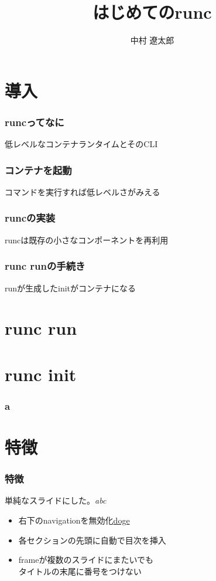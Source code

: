 \documentclass[unicode, 14pt]{beamer}
\title{はじめてのrunc}
\author{中村 遼太郎}
\begin{document}
\begin{frame}
\titlepage
\end{frame}
\section{導入}
\begin{frame}[t]
  \frametitle{runcってなに}
  低レベルなコンテナランタイムとそのCLI
\end{frame}
\begin{frame}[t]
  \frametitle{コンテナを起動}
  コマンドを実行すれば低レベルさがみえる
\end{frame}
\begin{frame}[t]
  \frametitle{runcの実装}
  runcは既存の小さなコンポーネントを再利用
\end{frame}
\begin{frame}[t]
  \frametitle{runc runの手続き}
  runが生成したinitがコンテナになる
\end{frame}
\section{runc run}
\begin{frame}[t]
  \end{frame}
\section{runc init}

\begin{frame}[t]
  \frametitle{a}
\end{frame}
\section{特徴}
\begin{frame}[t]
  \frametitle{特徴}
    単純なスライドにした。\textit{abc}
  \vspace{0.2\paperheight}
  \begin{itemize}
    \item 右下のnavigationを無効化\href{https://google.com}{doge}
    \item 各セクションの先頭に自動で目次を挿入
    \item frameが複数のスライドにまたいでも\\タイトルの末尾に番号をつけない
  \end{itemize}
\end{frame}
\end{document}
